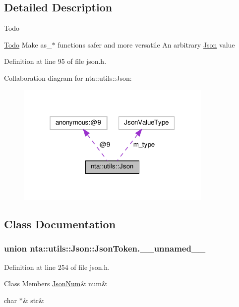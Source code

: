\subsection{Detailed Description}
\begin{DoxyRefDesc}{Todo}
\item[\hyperlink{todo__todo000006}{Todo}]Make as\+\_\+$\ast$ functions safer and more versatile An arbitrary \hyperlink{classnta_1_1utils_1_1Json}{Json} value \end{DoxyRefDesc}


Definition at line 95 of file json.\+h.



Collaboration diagram for nta\+:\+:utils\+:\+:Json\+:\nopagebreak
\begin{figure}[H]
\begin{center}
\leavevmode
\includegraphics[width=268pt]{d2/de6/classnta_1_1utils_1_1Json__coll__graph}
\end{center}
\end{figure}


\subsection{Class Documentation}
\label{unionnta_1_1utils_1_1Json_1_1JsonToken_8____unnamed____}
\subsubsection{union nta\+:\+:utils\+:\+:Json\+:\+:Json\+Token.\+\_\+\+\_\+unnamed\+\_\+\+\_\+}


Definition at line 254 of file json.\+h.

\begin{DoxyFields}{Class Members}
\mbox{\label{classnta_1_1utils_1_1Json_a0fc3cfbc27e91ea60a787de13dae3e3c}} 
\hyperlink{classnta_1_1utils_1_1JsonNum}{JsonNum}&
num&
\\
\hline

\mbox{\label{classnta_1_1utils_1_1Json_a341be97d9aff90c9978347f66f945b77}} 
char $\ast$&
str&
\\
\hline

\end{DoxyFields}


